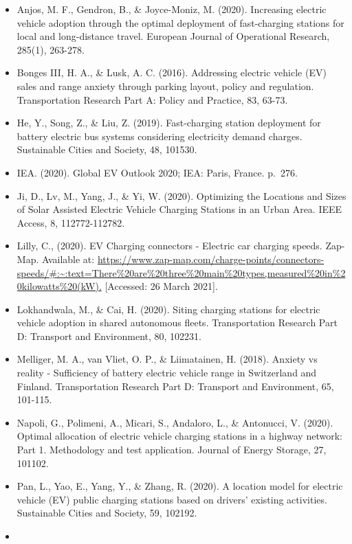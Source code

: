 \documentclass[
]{book}
\providecommand{\tightlist}{%
  \setlength{\itemsep}{0pt}\setlength{\parskip}{0pt}}
\begin{document}
\begin{itemize}
\tightlist
\item
  Anjos, M. F., Gendron, B., \& Joyce-Moniz, M. (2020). Increasing electric vehicle adoption through the optimal deployment of fast-charging stations for local and long-distance travel. European Journal of Operational Research, 285(1), 263-278.
\item
  Bonges III, H. A., \& Lusk, A. C. (2016). Addressing electric vehicle (EV) sales and range anxiety through parking layout, policy and regulation. Transportation Research Part A: Policy and Practice, 83, 63-73.
\item
  He, Y., Song, Z., \& Liu, Z. (2019). Fast-charging station deployment for battery electric bus systems considering electricity demand charges. Sustainable Cities and Society, 48, 101530.
\item
  IEA. (2020). Global EV Outlook 2020; IEA: Paris, France. p.~276.
\item
  Ji, D., Lv, M., Yang, J., \& Yi, W. (2020). Optimizing the Locations and Sizes of Solar Assisted Electric Vehicle Charging Stations in an Urban Area. IEEE Access, 8, 112772-112782.
\item
  Lilly, C., (2020). EV Charging connectors - Electric car charging speeds. Zap-Map. Available at: \url{https://www.zap-map.com/charge-points/connectors-speeds/\#:~:text=There\%20are\%20three\%20main\%20types,measured\%20in\%20kilowatts\%20(kW).} {[}Accessed: 26 March 2021{]}.
\item
  Lokhandwala, M., \& Cai, H. (2020). Siting charging stations for electric vehicle adoption in shared autonomous fleets. Transportation Research Part D: Transport and Environment, 80, 102231.
\item
  Melliger, M. A., van Vliet, O. P., \& Liimatainen, H. (2018). Anxiety vs reality - Sufficiency of battery electric vehicle range in Switzerland and Finland. Transportation Research Part D: Transport and Environment, 65, 101-115.
\item
  Napoli, G., Polimeni, A., Micari, S., Andaloro, L., \& Antonucci, V. (2020). Optimal allocation of electric vehicle charging stations in a highway network: Part 1. Methodology and test application. Journal of Energy Storage, 27, 101102.
\item
  Pan, L., Yao, E., Yang, Y., \& Zhang, R. (2020). A location model for electric vehicle (EV) public charging stations based on drivers' existing activities. Sustainable Cities and Society, 59, 102192.
\item

\end{itemize}
\end{document}
